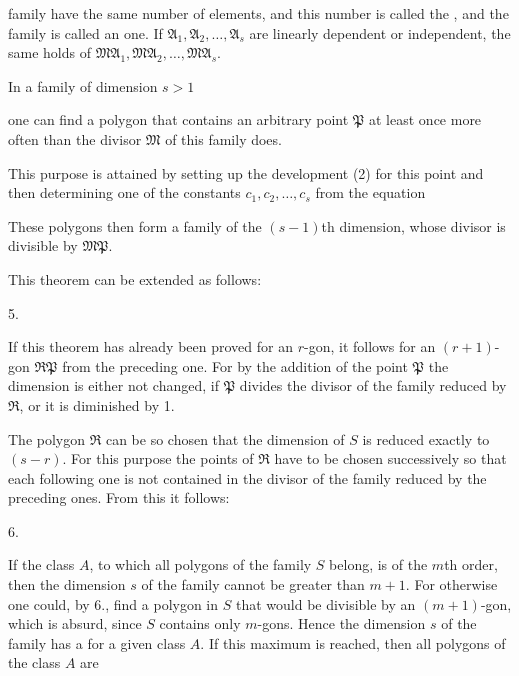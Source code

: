 
family have the same number of elements, and this number is called the
, and the family is called an  one.
If $\mathfrak{A}_1, \mathfrak{A}_2, \ldots, \mathfrak{A}_s$ are linearly dependent or independent, the same
holds of $\mathfrak{M}\mathfrak{A}_1, \mathfrak{M}\mathfrak{A}_2, \ldots, \mathfrak{M}\mathfrak{A}_s$.

In a family of dimension $s > 1$


one can find a polygon that contains an arbitrary point $\mathfrak{P}$ at least
once more often than the divisor $\mathfrak{M}$ of this family does.

This purpose is attained by setting up the development (2) for this
point and then determining one of the constants $c_1, c_2, \ldots, c_s$
from the equation


These polygons then form a family of the $(s-1)$th
dimension, whose divisor is divisible by $\mathfrak{M}\mathfrak{P}$.

This theorem can be extended as follows:

5. 

If this theorem has already been proved for an $r$-gon, it follows
for an $(r+1)$-gon $\mathfrak{R}\mathfrak{P}$ from the preceding one.
For by the
addition of the point $\mathfrak{P}$ the dimension is either not
changed, if $\mathfrak{P}$ divides the divisor of the family reduced by $\mathfrak{R}$,
or it is diminished by 1.

The polygon $\mathfrak{R}$ can be so chosen that the dimension of
$S$ is reduced exactly to $(s-r)$. For this purpose the
points of $\mathfrak{R}$ have to be chosen successively so that each following one
is not contained in the divisor of the family reduced by the
preceding ones. From this it follows:

6. 

If the class $A$, to which all polygons of the family $S$ belong,
is of the $m$th order, then the dimension $s$ of the family cannot
be greater than $m+1$. For otherwise one could, by 6., find
a polygon in $S$ that would be divisible by an $(m+1)$-gon,
which is absurd, since $S$ contains only $m$-gons. Hence the
dimension $s$ of the family has a  for a given class $A$.
If this maximum is reached, then all polygons of the class $A$ are
